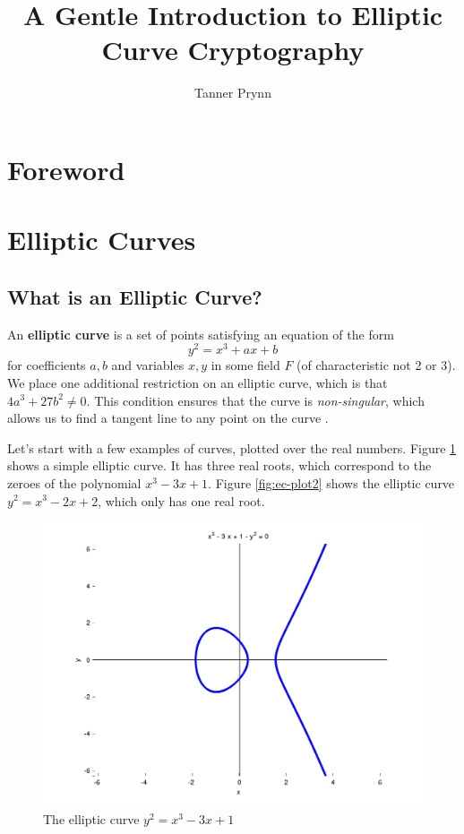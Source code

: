 \documentclass{article}
\begin{document}
\title{A Gentle Introduction to Elliptic Curve Cryptography}
\author{Tanner Prynn}
\maketitle

\tableofcontents
\clearpage

\section*{Foreword}

\section{Elliptic Curves}

\subsection{What is an Elliptic Curve?}
An \textbf{elliptic curve} is a set of points satisfying an equation of the form
$$y^2 = x^3 + ax + b$$
for coefficients $a,b$ and variables $x,y$ in some field $F$ (of characteristic not 2 or 3). 
We place one additional restriction on an elliptic curve, which is that
$4a^3 + 27b^2 \neq 0$.
This condition ensures that the curve is \textit{non-singular}, which allows us to find a tangent line to any point on the curve \cite[$\S$3.1]{ecc-guide}.

Let's start with a few examples of curves, plotted over the real numbers.
Figure \ref{fig:ec-plot} shows a simple elliptic curve.
It has three real roots, which correspond to the zeroes of the polynomial $x^3 - 3x + 1$.
Figure \ref{fig:ec-plot2} shows the elliptic curve $y^2 = x^3 - 2x + 2$, which only has one real root.

\begin{figure}[h]
\centering
\includegraphics[width=\textwidth]{images/ec1.png}
\caption{The elliptic curve $y^2 = x^3 - 3x + 1$}
\label{fig:ec-plot}
\end{figure}
\end{document}
